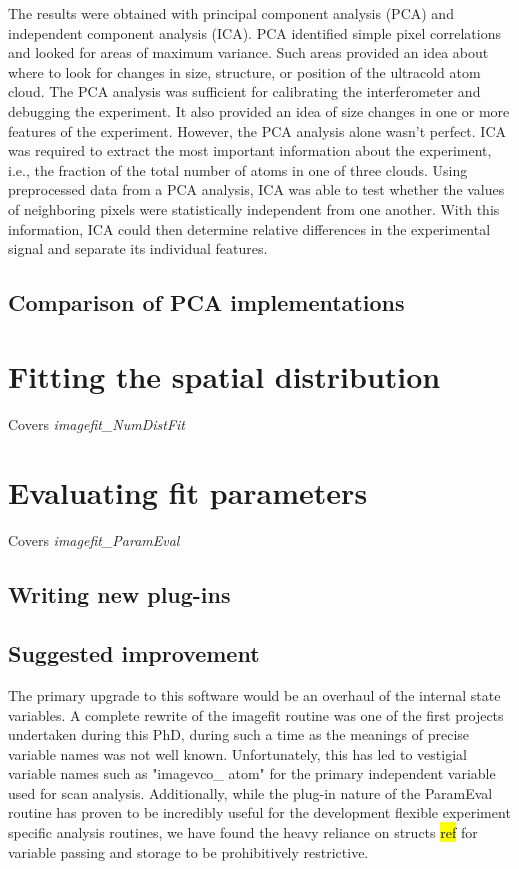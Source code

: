 The results were obtained with principal component analysis (PCA) and independent component analysis (ICA). PCA identified simple pixel correlations and looked for areas of maximum variance. Such areas provided an idea about where to look for changes in size, structure, or position of the ultracold atom cloud. The PCA analysis was sufficient for calibrating the interferometer and debugging the experiment. It also provided an idea of size changes in one or more features of the experiment. However, the PCA analysis alone wasn’t perfect. ICA was required to extract the most important information about the experiment, i.e., the fraction of the total number of atoms in one of three clouds. Using preprocessed data from a PCA analysis, ICA was able to test whether the values of neighboring pixels were statistically independent from one another. With this information, ICA could then determine relative differences in the experimental signal and separate its individual features.


\subsection{Comparison of PCA implementations}

\section{Fitting the spatial distribution}

Covers \emph{imagefit\_NumDistFit}

\section{Evaluating fit parameters}

Covers \emph{imagefit\_ParamEval}

\subsection{Writing new plug-ins}

\subsection{Suggested improvement}

The primary upgrade to this software would be an overhaul of the internal state variables.
A complete rewrite of the imagefit routine was one of the first projects undertaken during this PhD, during such a time as the meanings of precise variable names was not well known.
Unfortunately, this has led to vestigial variable names such as "imagevco\_ atom" for the primary independent variable used for scan analysis.
Additionally, while the plug-in nature of the ParamEval routine has proven to be incredibly useful for the development flexible experiment specific analysis routines, we have found the heavy reliance on structs \hl{ref} for variable passing and storage to be prohibitively restrictive.

